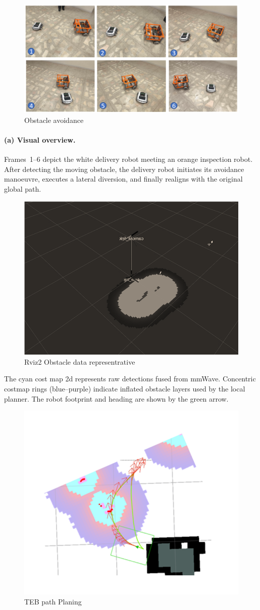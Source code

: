 \begin{figure}[H]
    \centering
    \includegraphics[width=1\linewidth]{Src//images/object.png}
    \caption{Obstacle avoidance}
    \label{fig:enter-label}
\end{figure}


\paragraph{(a) Visual overview.}
Frames~1–6 depict the white delivery robot meeting an orange inspection robot.
After detecting the moving obstacle, the delivery robot initiates its avoidance manoeuvre,
executes a lateral diversion, and finally realigns with the original global path.

\begin{figure}[H]
    \centering
    \includegraphics[width=0.5\linewidth]{Src//images/Ros2Obstacle.png}
    \caption{Rviz2 Obstacle data representrative}
    \label{fig:Rviz2_Obstacle}
\end{figure}

The cyan cost map 2d represents raw detections fused from mmWave.
Concentric costmap rings (blue–purple) indicate inflated obstacle layers used by the local planner.
The robot footprint and heading are shown by the green arrow.


\begin{figure}[H]
    \centering
    \includegraphics[width=0.5\linewidth]{Src/images/image(18).PNG}
    \caption{TEB path Planing}
    \label{fig:TEB}
\end{figure}



